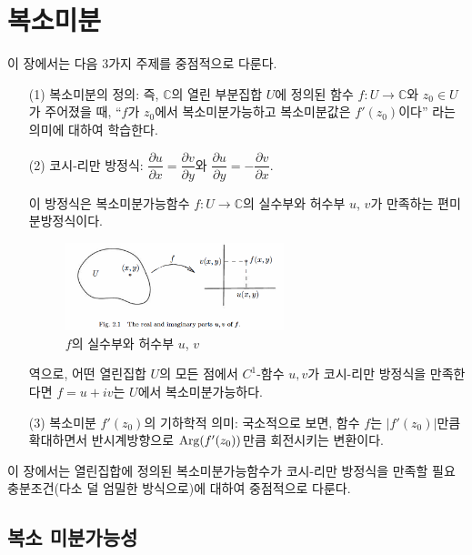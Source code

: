 
\chapter{복소미분}

이 장에서는 다음 3가지 주제를 중점적으로 다룬다.

\begin{itemize}
\item[(1)] 복소미분의 정의:
즉, $\mathbb C$의 열린 부분집합 $U$에 정의된 함수 $f:U\to\mathbb C$와
$z_0\in U$가 주어졌을 때, ``$f$가 $z_0$에서 복소미분가능하고 복소미분값은 $f'(z_0)$이다''
라는 의미에 대하여 학습한다.
\item[(2)] 코시-리만 방정식: 
$\dfrac{\partial u}{\partial x} = \dfrac{\partial v}{\partial y}$와
$\dfrac{\partial u}{\partial y} = - \dfrac{\partial v}{\partial x}$.

이 방정식은 
복소미분가능함수 $f:U\to\mathbb C$의 실수부와 허수부 $u$, $v$가
만족하는 편미분방정식이다.

\begin{figure}[!h]
\begin{center}
\includegraphics[width=0.6\textwidth]{./SaltChapter/fig-2-1}
\end{center}
\caption{$f$의 실수부와 허수부 $u$, $v$}
\label{fig-2-1}
\end{figure}

역으로, 어떤 열린집합 $U$의 모든 점에서 $C^1$-함수 $u, v$가 
코시-리만 방정식을 만족한다면 $f=u+iv$는 $U$에서 복소미분가능하다.

\item[(3)] 복소미분 $f'(z_0)$의 기하학적 의미:
국소적으로 보면, 함수 $f$는 $|f'(z_0)|$만큼 확대하면서
반시계방향으로 $\mathop{\mathrm{Arg}}(f'(z_0))$만큼 회전시키는 변환이다.
\end{itemize}

이 장에서는
열린집합에 정의된 복소미분가능함수가 
코시-리만 방정식을 만족할 필요충분조건(다소 덜 엄밀한 방식으로)에 대하여
중점적으로 다룬다.

\section{복소 미분가능성}

